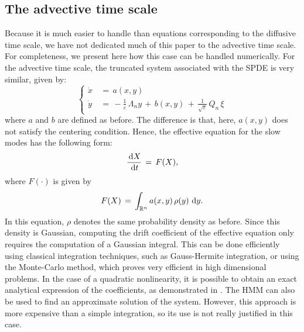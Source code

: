 \subsection{The advective time scale}
\label{sec:the_advective_time_scale}
Because it is much easier to handle than equations corresponding to the diffusive time scale, we have not dedicated much of this paper to the advective time scale.
For completeness, we present here how this case can be handled numerically.
For the advective time scale, the truncated system associated with the SPDE is very similar, given by:
\begin{equation}
    \left\{\begin{aligned}
            \dot x\,&=\,a(x,y) \\
            \dot y\,&=\,-\frac 1 {\varepsilon}\, \Lambda_n y\,+\,b(x,y)\,+\,\frac 1{\sqrt \varepsilon}\,Q_n\,\xi
        \end{aligned} \right.
\end{equation}
where $a$ and $b$ are defined as before. The difference is that, here, $a(x,y)$ does not satisfy the centering condition.
Hence, the effective equation for the slow modes has the following form:
$$ \frac{\,\mathrm d X}{\,\mathrm d t}\,=\, F(X), $$
where $F(\cdot)$ is given by
$$ F(X) \,=\, \int_{\mathbb R^n} a(x,y) \, \rho(y)\, \,\mathrm d y.  $$
In this equation, $\rho$ denotes the same probability density as before.
Since this density is Gaussian, computing the drift coefficient of the effective equation only requires the computation of a Gaussian integral.
This can be done efficiently using classical integration techniques, such as Gauss-Hermite integration, or using the Monte-Carlo method, which proves very efficient in high dimensional problems.
In the case of a quadratic nonlinearity, it is possible to obtain an exact analytical expression of the coefficients, as demonstrated in \cite{abdulle2012numerical}.
The HMM can also be used to find an approximate solution of the system.
However, this approach is more expensive than a simple integration, so its use is not really justified in this case.
